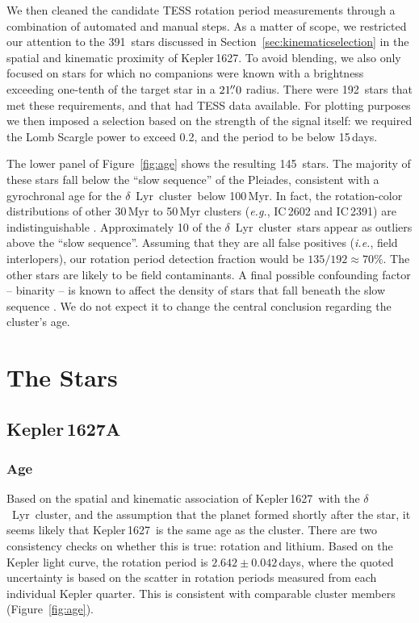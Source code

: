 \documentclass[12pt,modern,twocolumn,tighten]{aastex63}
\newcommand{\cn}{$\delta$\ Lyr\ cluster} %
\newcommand{\sn}{Kepler\,1627} %
\newcommand{\nkinwithtess}{391} %
\newcommand{\nkinwithtessandcrowding}{192} %
\newcommand{\nkindefaultcleaning}{145} %
\newcommand{\nrotgood}{135} %
\newcommand{\nfracprot}{70} %
\begin{document}
We then cleaned the candidate TESS rotation period measurements
through a combination of automated and manual steps.  As a matter of
scope, we restricted our attention to the \nkinwithtess\ stars
discussed in Section~\ref{sec:kinematicselection} in the spatial and
kinematic proximity of Kepler\,1627.  To avoid blending, we also only
focused on stars for which no companions were known with a brightness
exceeding one-tenth of the target star in a $21\mbox{$.\!\!^{\prime\prime}$}0$ radius.  There
were \nkinwithtessandcrowding\ stars that met these requirements, and
that had TESS data available.  For plotting purposes we then imposed a
selection based on the strength of the signal itself: we required the
Lomb Scargle power to exceed 0.2, and the period to be below 15\,days.

The lower panel of Figure~\ref{fig:age} shows the resulting
\nkindefaultcleaning\ stars.  The majority of these stars fall below
the ``slow sequence'' of the Pleiades, consistent with a gyrochronal
age for the \cn\ below 100\,Myr.  In fact, the rotation-color
distributions of other 30\,Myr to 50\,Myr clusters ({\it e.g.},
IC\,2602 and IC\,2391) are indistinguishable
\citep{douglas_stephanie_t_2021_5131306}. 
Approximately 10 of the \cn\ stars appear as outliers above
the ``slow sequence''.  Assuming that they are all false positives
({\it i.e.}, field interlopers), our rotation period detection
fraction would be $\nrotgood/\nkinwithtessandcrowding \approx
\nfracprot\%$.   
The other stars are likely to be field contaminants.
A final possible confounding factor -- binarity -- is known to affect
the density of stars that fall beneath the slow sequence
\citep{meibom_effect_2007,gillen_ngts_2020,bouma_2021_ngc2516}.  We do
not expect it to change the central conclusion regarding the cluster's
age.


\section{The Stars}
\label{sec:stars}

\subsection{Kepler\,1627A}
\subsubsection{Age}
Based on the spatial and kinematic association of \sn\ with the \cn,
and the assumption that the planet formed shortly after the star, it
seems likely that \sn\ is the same age as the cluster. There are
two consistency checks on whether this is true: rotation and lithium.  Based on the Kepler
light curve, the rotation period is $2.642\pm0.042$\,days, where the
quoted uncertainty is based on the scatter in rotation periods
measured from each individual Kepler quarter.  This is consistent with
comparable cluster members (Figure~\ref{fig:age}).
\end{document}
